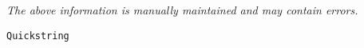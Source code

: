 \label{pkg:quickstring\_\_premicrothread}

{\tiny \it The above information is manually maintained and may contain errors.}
\begin{verbatim}
Quickstring
\end{verbatim}
